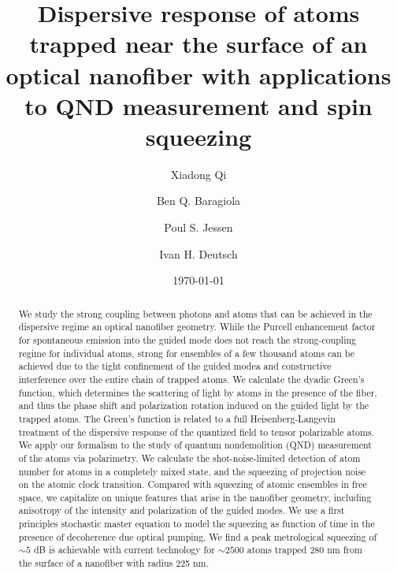 \documentclass[aps,pra,twocolumn]{revtex4-1} %
\begin{document}
\title{Dispersive response of atoms trapped near the surface of an optical nanofiber with applications to QND measurement and spin squeezing}
\author{Xiadong Qi}
\author{Ben Q. Baragiola}
\author{Poul S. Jessen}
\author{Ivan H. Deutsch}
\date{\today}

\begin{abstract}
We study the strong coupling between photons and atoms that can be achieved in the dispersive regime an optical nanofiber geometry.  While the Purcell enhancement factor for spontaneous emission into the guided mode does not reach the strong-coupling regime for individual atoms, strong  for ensembles of a few thousand atoms can be achieved due to the tight confinement of the guided modea and constructive interference over the entire chain of trapped atoms. We calculate the dyadic Green's function, which determines the scattering of light by atoms in the presence of the fiber, and thus the phase shift and polarization rotation induced on the guided light by the trapped atoms.  The Green's function is related to a full Heisenberg-Langevin treatment of the dispersive response of the quantized field to tensor polarizable atoms.  We apply our formalism to the study of quantum nondemolition (QND) measurement of the atoms via polarimetry.  We calculate the shot-noise-limited detection of atom number for atoms in a completely mixed state, and the squeezing of projection noise on the atomic clock transition.  Compared with squeezing of atomic ensembles in free space, we capitalize on unique features that arise in the nanofiber geometry, including anisotropy of the intensity and polarization of the guided modes.  We use a first principles stochastic master equation to model the squeezing as function of time in the presence of decoherence due optical pumping.  We find a peak metrological squeezing of $\sim 5$ dB is achievable with current technology for $\sim 2500$ atoms trapped 280 nm from the surface of a nanofiber with radius 225 nm.  
\end{abstract}
\end{document}
